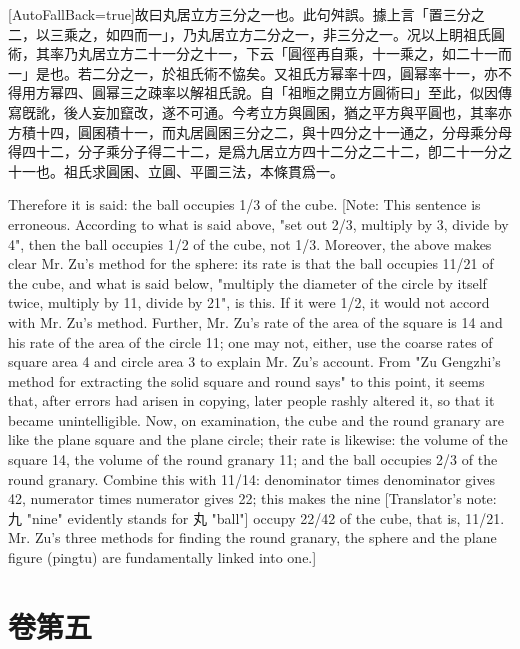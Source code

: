 \documentclass[11pt]{article}
\newcommand{\zhsmall}{\footnotesize\color{black!70}}
\newcommand{\unitlabel}[1]{\marginpar{\raggedleft\tiny\color{gray}#1}}
\newenvironment{unitzh}{\par\CJKfontspec{Noto Serif CJK SC}[AutoFallBack=true]\large\linespread{1.25}\selectfont}{\par}
\newenvironment{uniten}{\par\small\color{black!85}}{\par\medskip}
\begin{document}
\begin{unitzh}\unitlabel{jiuzhang-017.17}故曰丸居立方三分之一也。{\zhsmall 此句舛誤。據上言「置三分之二，以三乘之，如四而一」，乃丸居立方二分之一，非三分之一。况以上眀祖氏圓術，其率乃丸居立方二十一分之十一，下云「圓徑再自乘，十一乘之，如二十一而一」是也。若二分之一，於祖氏術不恊矣。又祖氏方幂率十四，圓幂率十一，亦不得用方幂四、圓幂三之疎率以解祖氏說。自「祖暅之開立方圓術曰」至此，似因傳寫旣訛，後人妄加竄改，遂不可通。今考立方與圓囷，猶之平方與平圓也，其率亦方積十四，圓囷積十一，而丸居圓囷三分之二，與十四分之十一通之，分母乘分母得四十二，分子乘分子得二十二，是爲九居立方四十二分之二十二，卽二十一分之十一也。祖氏求圓囷、立圓、平圖三法，本條貫爲一。}\end{unitzh}
\begin{uniten}Therefore it is said: the ball occupies 1/3 of the cube. [Note: This sentence is erroneous. According to what is said above, "set out 2/3, multiply by 3, divide by 4", then the ball occupies 1/2 of the cube, not 1/3. Moreover, the above makes clear Mr. Zu's method for the sphere: its rate is that the ball occupies 11/21 of the cube, and what is said below, "multiply the diameter of the circle by itself twice, multiply by 11, divide by 21", is this. If it were 1/2, it would not accord with Mr. Zu's method. Further, Mr. Zu's rate of the area of the square is 14 and his rate of the area of the circle 11; one may not, either, use the coarse rates of square area 4 and circle area 3 to explain Mr. Zu's account. From "Zu Gengzhi's method for extracting the solid square and round says" to this point, it seems that, after errors had arisen in copying, later people rashly altered it, so that it became unintelligible. Now, on examination, the cube and the round granary are like the plane square and the plane circle; their rate is likewise: the volume of the square 14, the volume of the round granary 11; and the ball occupies 2/3 of the round granary. Combine this with 11/14: denominator times denominator gives 42, numerator times numerator gives 22; this makes the nine [Translator's note: 九 "nine" evidently stands for 丸 "ball"] occupy 22/42 of the cube, that is, 11/21. Mr. Zu's three methods for finding the round granary, the sphere and the plane figure (pingtu) are fundamentally linked into one.]\end{uniten}

\section*{卷第五}
\end{document}
